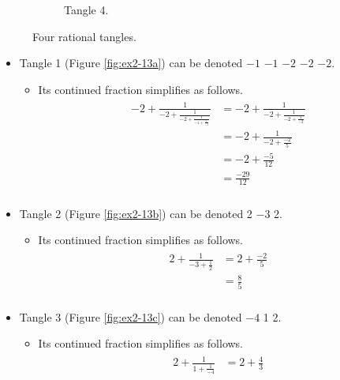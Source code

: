 \documentclass[titlepage]{article}
\numberwithin{figure}{section}
\numberwithin{table}{section}
\numberwithin{equation}{section}
\begin{document}
\begin{itemize}
\begin{figure}[h!]
\begin{subfigure}[b]{0.16\linewidth}
            \caption{Tangle 4.}
            \label{fig:ex2-13d}
        \end{subfigure}
        \caption{Four rational tangles.}
        \label{fig:ex2-13}
    \end{figure}
    \begin{itemize}
        \item Tangle 1 (Figure \ref{fig:ex2-13a}) can be denoted $-1$ $-1$ $-2$ $-2$ $-2$.
        \begin{itemize}
            \item Its continued fraction simplifies as follows.
            \begin{align}
                \begin{split}
                    -2+\frac{1}{-2+\frac{1}{-2+\frac{1}{-1+\frac{1}{-1}}}} &= -2+\frac{1}{-2+\frac{1}{-2+\frac{1}{-2}}}\\
                    &= -2+\frac{1}{-2+\frac{-2}{5}}\\
                    &= -2+\frac{-5}{12}\\
                    &= \frac{-29}{12}\\
                \end{split}
            \end{align}
        \end{itemize}
        \item Tangle 2 (Figure \ref{fig:ex2-13b}) can be denoted 2 $-3$ 2.
        \begin{itemize}
            \item Its continued fraction simplifies as follows.
            \begin{align}
                \begin{split}\label{eqn:ex2-13b}
                    2+\frac{1}{-3+\frac{1}{2}} &= 2+\frac{-2}{5}\\
                    &= \frac{8}{5}\\
                \end{split}
            \end{align}
        \end{itemize}
        \item Tangle 3 (Figure \ref{fig:ex2-13c}) can be denoted $-4$ 1 2.
        \begin{itemize}
            \item Its continued fraction simplifies as follows.
            \begin{align}
                \begin{split}
                    2+\frac{1}{1+\frac{1}{-4}} &= 2+\frac{4}{3}\\

\end{split}
\end{align}
\end{itemize}
\end{itemize}
\end{itemize}
\end{document}
